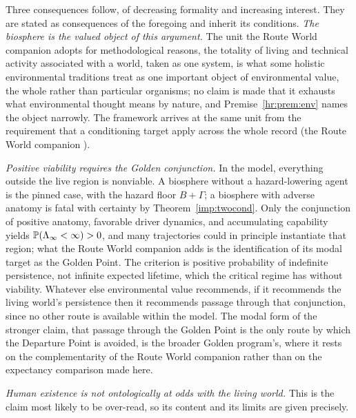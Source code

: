 Three consequences follow, of decreasing formality and increasing
interest. They are stated as consequences of the foregoing and inherit
its conditions. \emph{The biosphere is the valued object of this argument.} The unit
the Route World companion \cite{GoldenRouteWorld} adopts for methodological reasons, the totality of
living and technical activity associated with a world, taken as one
system, is what some holistic environmental traditions treat as one
important object of environmental value, the whole rather than
particular organisms; no claim is made that it exhausts what
environmental thought means by nature, and Premise~\ref{hr:prem:env}
names the object narrowly. The framework arrives at the same unit from
the requirement that a conditioning target apply across the whole record
(the Route World companion \cite{GoldenRouteWorld}).

\emph{Positive viability requires the Golden conjunction.} In the model,
everything outside the live region is nonviable. A biosphere without a
hazard-lowering agent is the pinned case, with the hazard floor
$B+\Gamma$; a biosphere with adverse anatomy is fatal with certainty by
Theorem~\ref{imp:twocond}. Only the conjunction of positive anatomy,
favorable driver dynamics, and accumulating capability yields
$\mathbb{P}(\Lambda_\infty<\infty)>0$, and many trajectories could in
principle instantiate that region; what the Route World companion adds
is the identification of its modal target as the Golden Point. The
criterion is positive probability of indefinite persistence, not
infinite expected lifetime, which the critical regime has without
viability. Whatever else environmental value
recommends, if it recommends the living world's persistence then it
recommends passage through that conjunction, since no other route is
available within the model. The modal form of the stronger claim, that
passage through the Golden Point is the only route by which the
Departure Point is avoided, is the broader Golden program's, where it rests on the complementarity of
the Route World companion \cite{GoldenRouteWorld} rather than on the expectancy comparison made
here.

\emph{Human existence is not ontologically at odds with the living
world.} This is the claim most likely to be over-read, so its content
and its limits are given precisely.

